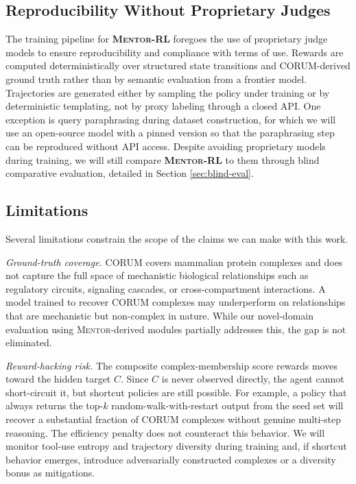 \documentclass[thesis,letterpaper,12pt]{utthesis}
\begin{document}
\subsection{Reproducibility Without Proprietary Judges}
The training pipeline for \textbf{\textsc{Mentor-RL}} foregoes the use of proprietary judge models to ensure reproducibility and compliance with terms of use. Rewards are computed deterministically over structured state transitions and CORUM-derived ground truth rather than by semantic evaluation from a frontier model. Trajectories are generated either by sampling the policy under training or by deterministic templating, not by proxy labeling through a closed API. One exception is query paraphrasing during dataset construction, for which we will use an open-source model with a pinned version so that the paraphrasing step can be reproduced without API access. Despite avoiding proprietary models during training, we will still compare \textbf{\textsc{Mentor-RL}} to them through blind comparative evaluation, detailed in Section \ref{sec:blind-eval}.

\subsection{Limitations}\label{sec:limitations}
Several limitations constrain the scope of the claims we can make with this work.

\textit{Ground-truth coverage.} CORUM covers mammalian protein complexes and does not capture the full space of mechanistic biological relationships such as regulatory circuits, signaling cascades, or cross-compartment interactions. A model trained to recover CORUM complexes may underperform on relationships that are mechanistic but non-complex in nature. While our novel-domain evaluation using \textsc{Mentor}-derived modules partially addresses this, the gap is not eliminated.

\textit{Reward-hacking risk.} The composite complex-membership score rewards moves toward the hidden target $C$. Since $C$ is never observed directly, the agent cannot short-circuit it, but shortcut policies are still possible. For example, a policy that always returns the top-$k$ random-walk-with-restart output from the seed set will recover a substantial fraction of CORUM complexes without genuine multi-step reasoning. The efficiency penalty does not counteract this behavior. We will monitor tool-use entropy and trajectory diversity during training and, if shortcut behavior emerges, introduce adversarially constructed complexes or a diversity bonus as mitigations.
\end{document}
